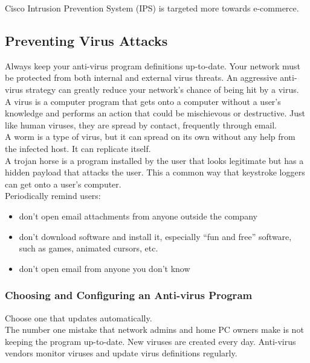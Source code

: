 Cisco Intrusion Prevention System (IPS) is targeted more towards e-commerce.

\subsection{Preventing Virus Attacks}

Always keep your anti-virus program definitions up-to-date. Your network
must be protected from both internal and external virus threats. An
aggressive anti-virus strategy can greatly reduce your network's chance
of being hit by a virus.\\

A virus is a computer program that gets onto a computer without a user's
knowledge and performs an action that could be mischievous or destructive.
Just like human viruses, they are spread by contact, frequently through
email.\\

A worm is a type of virus, but it can spread on its own without any help
from the infected host. It can replicate itself.\\

A trojan horse is a program installed by the user that looks legitimate
but has a hidden payload that attacks the user. This a common way that
keystroke loggers can get onto a user's computer.\\

Periodically remind users:

\begin{itemize}

\item don't open email attachments from anyone outside the company

\item don't download software and install it, especially ``fun and free''
software, such as games, animated cursors, etc.

\item don't open email from anyone you don't know

\end{itemize}

\subsubsection{Choosing and Configuring an Anti-virus Program}

Choose one that updates automatically.\\

The number one mistake that network admins and home PC owners make is not
keeping the program up-to-date. New viruses are created every day. Anti-virus
vendors monitor viruses and update virus definitions regularly.\\

